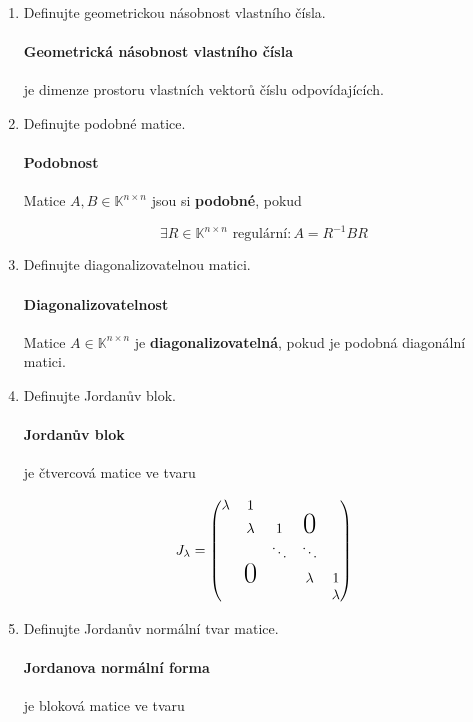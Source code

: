 \documentclass[10pt,a4paper]{article}
\theoremstyle{plain}
\begin{document}
\begin{enumerate}
\item Definujte geometrickou násobnost vlastního čísla.

\paragraph{Geometrická násobnost vlastního čísla} je dimenze prostoru vlastních vektorů číslu odpovídajících.

\item Definujte podobné matice.

\paragraph{Podobnost} Matice $A,B \in \mathbb{K}^{n \times n}$ jsou si \textbf{podobné}, pokud

\[ \exists R \in \mathbb{K}^{n \times n} \text{ regulární}: A = R^{-1}BR\]

\item Definujte diagonalizovatelnou matici.

\paragraph{Diagonalizovatelnost} Matice $A \in \mathbb{K}^{n \times n}$ je \textbf{diagonalizovatelná}, pokud je podobná diagonální matici.

\item Definujte Jordanův blok.

\paragraph{Jordanův blok} je čtvercová matice ve tvaru

\[ J_\lambda = \begin{pmatrix}
\lambda & 1		  &  	   & 		 &   \\
 		& \lambda & 1  	   & \mbox{\huge{0}}		 &   \\
		& 		  & \ddots & \ddots  &   \\
		& \mbox{\huge{0}}& 		   & \lambda & 1 \\
		& 		  & 		   & 		 & \lambda 
\end{pmatrix} \]

\newpage

\item Definujte Jordanův normální tvar matice.

\paragraph{Jordanova normální forma} je bloková matice ve tvaru


\end{enumerate}
\end{document}
